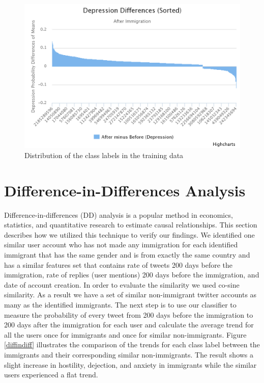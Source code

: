 \documentclass{article}
\begin{document}
\begin{figure}[ht]
\vskip 0.1in
\begin{center}
\centerline{\includegraphics[width=\columnwidth]{Figures/DejectionDiff.png}}
\caption{Distribution of the class labels in the training data}
\label{dejdiff}
\end{center}
\vskip -0.2in
\end{figure}

\section{Difference-in-Differences Analysis}

Difference-in-differences (DD) analysis is a popular method in economics, statistics, and quantitative research to estimate causal relationships. This section describes how we utilized this technique to verify our findings. We identified one similar user account who has not made any immigration for each identified immigrant that has the same gender and is from exactly the same country and has a similar features set that contains rate of tweets 200 days before the immigration, rate of replies (user mentions) 200 days before the immigration, and date of account creation. In order to evaluate the similarity we used co-sine similarity. As a result we have a set of similar non-immigrant twitter accounts as many as the identified immigrants. The next step is to use our classifier to measure the probability of every tweet from 200 days before the immigration to 200 days after the immigration for each user and calculate the average trend for all the users once for immigrants and once for similar non-immigrants. Figure \ref{diffindiff} illustrates the comparison of the trends for each class label between the immigrants and their corresponding similar non-immigrants. The result shows a slight increase in hostility, dejection, and anxiety in immigrants while the similar users experienced a flat trend. 
\end{document}
